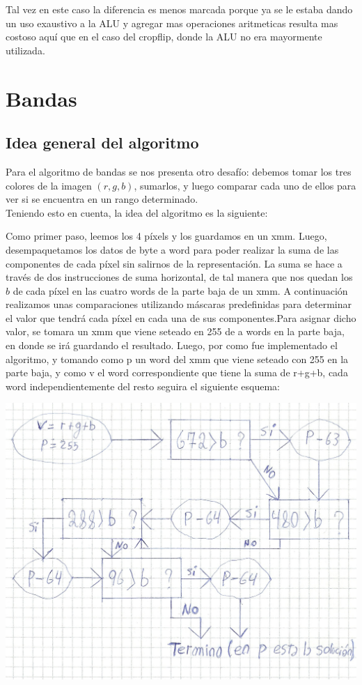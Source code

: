 \documentclass[a4paper]{article}
\begin{document}
Tal vez en este caso la diferencia es menos marcada porque ya se le estaba dando un uso exaustivo a la ALU y agregar mas operaciones aritmeticas resulta mas costoso aquí que en el caso del cropflip, donde la ALU no era mayormente utilizada.

\newpage
\section{Bandas}
\subsection{Idea general del algoritmo}
Para el algoritmo de bandas se nos presenta otro desafío: debemos tomar los tres colores de la imagen $(r,g,b)$, sumarlos, y luego comparar cada uno de ellos para ver si se encuentra en un rango determinado.
\\
Teniendo esto en cuenta, la idea del algoritmo es la siguiente:

Como primer paso, leemos los 4 píxels y los guardamos en un xmm. Luego, desempaquetamos los datos de byte a word para poder realizar la suma de las componentes de cada píxel sin salirnos de la representación. La suma se hace a través de dos instrucciones de suma horizontal, de tal manera que nos quedan los $b$ de cada píxel en las cuatro words de la parte baja de un xmm. A continuación realizamos unas comparaciones utilizando máscaras predefinidas para determinar el valor que tendrá cada píxel en cada una de sus componentes.Para asignar dicho valor, se tomara un xmm que viene seteado en 255 de a words en la parte baja, en donde se irá guardando el resultado. Luego, por como fue implementado el algoritmo, y tomando como p un word del xmm que viene seteado con 255 en la parte baja, y como v el word correspondiente que tiene la suma de r+g+b, cada word independientemente del resto seguira el siguiente esquema:

\begin{center}
\includegraphics[scale=0.66]{Dibujos/B1.jpg}
\end{center}
\end{document}
